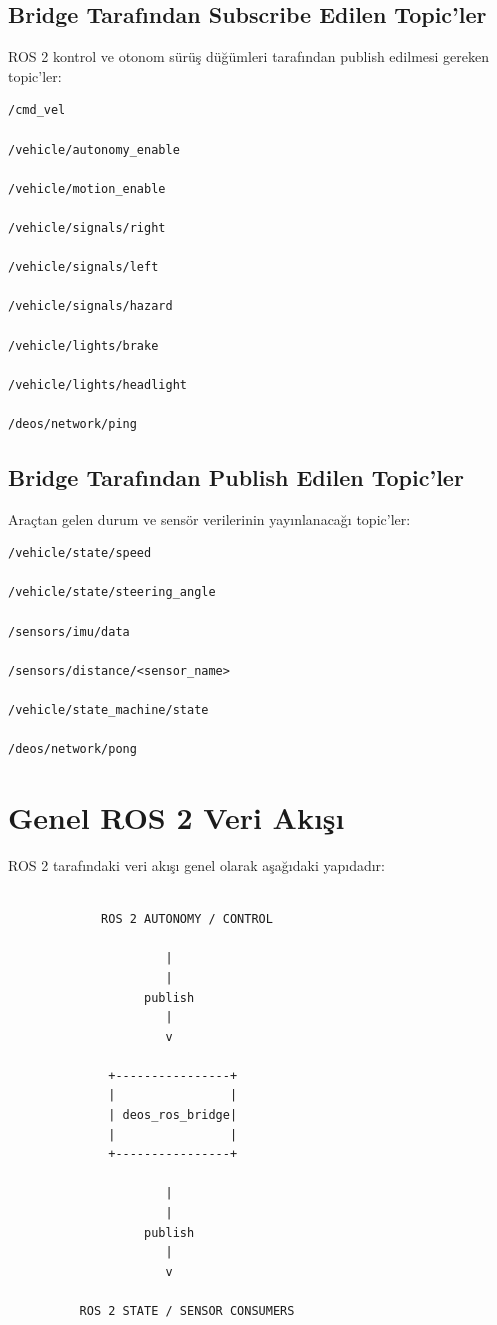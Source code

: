 \documentclass[12pt,a4paper]{article}
\begin{document}
\subsection{Bridge Tarafından Subscribe Edilen Topic'ler}

ROS 2 kontrol ve otonom sürüş düğümleri tarafından publish edilmesi
gereken topic'ler:

\begin{verbatim}
/cmd_vel

/vehicle/autonomy_enable

/vehicle/motion_enable

/vehicle/signals/right

/vehicle/signals/left

/vehicle/signals/hazard

/vehicle/lights/brake

/vehicle/lights/headlight

/deos/network/ping
\end{verbatim}

\subsection{Bridge Tarafından Publish Edilen Topic'ler}

Araçtan gelen durum ve sensör verilerinin yayınlanacağı topic'ler:

\begin{verbatim}
/vehicle/state/speed

/vehicle/state/steering_angle

/sensors/imu/data

/sensors/distance/<sensor_name>

/vehicle/state_machine/state

/deos/network/pong
\end{verbatim}

\section{Genel ROS 2 Veri Akışı}

ROS 2 tarafındaki veri akışı genel olarak aşağıdaki yapıdadır:

\begin{verbatim}

             ROS 2 AUTONOMY / CONTROL

                      |
                      |
                   publish
                      |
                      v

              +----------------+
              |                |
              | deos_ros_bridge|
              |                |
              +----------------+

                      |
                      |
                   publish
                      |
                      v

          ROS 2 STATE / SENSOR CONSUMERS


\end{verbatim}
\end{document}
